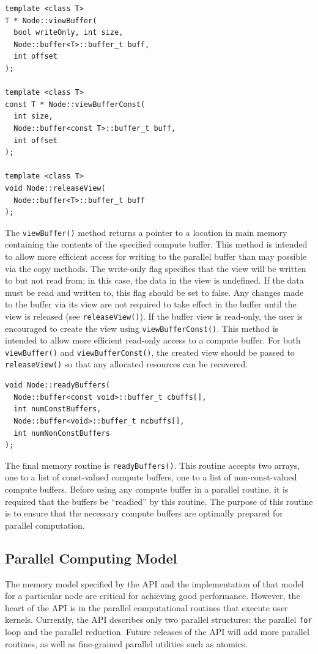 \documentclass[10pt,conference,letterpaper]{IEEEtran}
\begin{document}
{\small \begin{verbatim}
template <class T>
T * Node::viewBuffer(
  bool writeOnly, int size, 
  Node::buffer<T>::buffer_t buff, 
  int offset
);
  
template <class T>
const T * Node::viewBufferConst(
  int size,
  Node::buffer<const T>::buffer_t buff,
  int offset
);
  
template <class T>
void Node::releaseView(
  Node::buffer<T>::buffer_t buff
);
\end{verbatim}}
The \verb!viewBuffer()! method returns a pointer to a location in main memory containing the contents of the specified compute buffer. This method is intended to allow more efficient access for writing to the parallel buffer than may possible via the copy methods. The write-only flag specifies that the view will be written to but not read from; in this case, the data in the view is undefined. If the data must be read and written to, this flag should be set to false. Any changes made to the buffer via its view are not required to take effect in the buffer until the view is released (see \verb!releaseView()!). If the buffer view is read-only, the user is encouraged to create the view using \verb!viewBufferConst()!. This method is intended to allow more efficient read-only access to a compute buffer. For both \verb!viewBuffer()! and \verb!viewBufferConst()!, the created view should be passed to \verb!releaseView()! so that any allocated resources can be recovered.

{\small \begin{verbatim}
void Node::readyBuffers(
  Node::buffer<const void>::buffer_t cbuffs[],  
  int numConstBuffers,
  Node::buffer<void>::buffer_t ncbuffs[], 
  int numNonConstBuffers
);
\end{verbatim}}
The final memory routine is \verb!readyBuffers()!. This routine accepts two arrays, one to a list of const-valued compute buffers, one to a list of non-const-valued compute buffers. Before using any compute buffer in a parallel routine, it is required that the buffers be ``readied'' by this routine. The purpose of this routine is to ensure that the necessary compute buffers are optimally prepared for parallel computation.

\subsection{Parallel Computing Model}

The memory model specified by the API and the implementation of that model for a particular node are critical for achieving good performance. However, the heart of the API is in the parallel computational routines that execute user kernels. Currently, the API describes only two parallel structures: the parallel \verb!for! loop and the parallel reduction. Future releases of the API will add more parallel routines, as well as fine-grained parallel utilities such as atomics.
\end{document}
